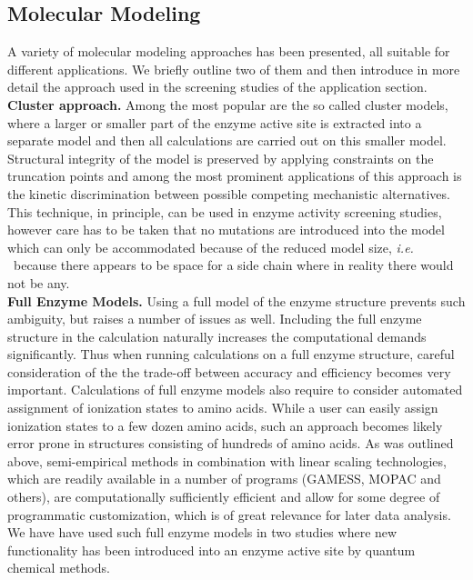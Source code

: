 \subsection{Molecular Modeling}\label{sec:modeling}
A variety of molecular modeling approaches has been presented, all suitable for different applications.
We briefly outline two of them and then introduce in more detail the approach used in the screening studies of the application section.\\
\textbf{Cluster approach.}
Among the most popular are the so called cluster models, where a larger or smaller part of the enzyme active site is extracted into a separate model and then all calculations are carried out on this smaller model.
Structural integrity of the model is preserved by applying constraints on the truncation points and among the most prominent applications of this approach is the kinetic discrimination between possible competing mechanistic alternatives\cite{noodleman2004quantum, himo2006quantum, siegbahn2009recent}.
This technique, in principle, can be used in enzyme activity screening studies, however care has to be taken that no mutations are introduced into the model which can only be accommodated because of the reduced model size, \textit{i.e. } because there appears to be space for a side chain where in reality there would not be any.\\
\textbf{Full Enzyme Models.}
Using a full model of the enzyme structure prevents such ambiguity, but raises a number of issues as well.
Including the full enzyme structure in the calculation naturally increases the computational demands significantly.
Thus when running calculations on a full enzyme structure, careful consideration of the the trade-off between accuracy and efficiency becomes very important.
Calculations of full enzyme models also require to consider automated assignment of ionization states to amino acids.
While a user can easily assign ionization states to a few dozen amino acids, such an approach becomes likely error prone in structures consisting of hundreds of amino acids.
As was outlined above, semi-empirical methods in combination with linear scaling technologies, which are readily available in a number of programs (GAMESS, MOPAC and others), are computationally sufficiently efficient and allow for some degree of programmatic customization, which is of great relevance for later data analysis.\\
We have have used such full enzyme models in two studies where new functionality has been introduced into an enzyme active site by quantum chemical methods\cite{10.1371/journal.pone.0049849,hediger2013silico,hediger2013computational}.\\
